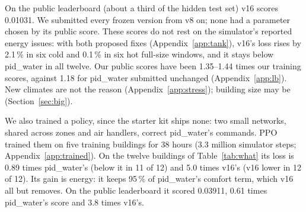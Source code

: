 \documentclass{article}
\begin{document}
On the public leaderboard (about a third of the hidden test set) v16 scores 0.01031. We submitted every frozen version from v8 on; none had a parameter chosen by its public score. These scores do
not rest on the simulator's reported energy issues: with both proposed fixes (Appendix~\ref{app:tank}), v16's loss
rises by 2.1\,\% in six cold and 0.1\,\% in six hot full-size windows, and it stays below pid\_water in all twelve. Our
public scores have been 1.35--1.44 times our training scores, against 1.18 for pid\_water submitted unchanged
(Appendix~\ref{app:lb}). New climates are not the reason (Appendix~\ref{app:stress}); building size may be
(Section~\ref{sec:big}).

We also trained a policy, since the starter kit ships none: two small networks, shared across zones and air
handlers, correct pid\_water's commands. PPO trained them on five training buildings for 38
hours (3.3 million simulator steps; Appendix~\ref{app:trained}). On the twelve buildings of Table~\ref{tab:what} its
loss is 0.89 times pid\_water's (below it in 11 of 12) and 5.0 times v16's (v16 lower in 12 of 12).
Its gain is energy: it keeps 95\,\% of pid\_water's comfort term, which v16 all but removes.
On the public leaderboard it scored 0.03911, 0.61 times pid\_water's score and 3.8 times v16's.
\end{document}
